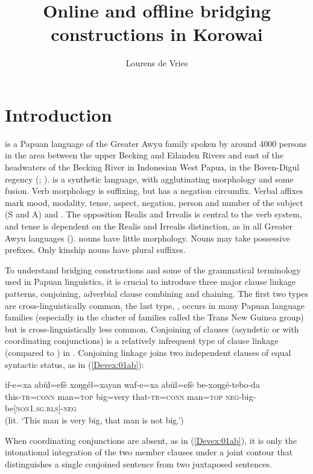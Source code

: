\documentclass[output=paper]{LSP/langsci}
\author{
   Lourens de Vries\affiliation{Vrije Universiteit Amsterdam} 
   }
\title{Online and offline bridging constructions in Korowai}
\begin{document}
\section{Introduction} 
\label{Devsec:Introduction}
 is a Papuan language of the Greater Awyu family spoken by around 4000 persons in the area between the upper Becking and Eilanden Rivers and east of the headwaters of the Becking River in Indonesian West Papua, in the Boven-Digul regency (\citealt{enk97}; \citealt{devries.2012}).  is a synthetic language, with agglutinating morphology and some fusion. Verb morphology is suffixing, but  has a negation circumfix. Verbal affixes mark mood, modality, tense, aspect, negation, person and number of the subject (S and A) and . The opposition Realis and Irrealis is central to the verb system, and tense is dependent on the Realis and Irrealis distinction, as in all Greater Awyu languages (\citealt{wester14}).  nouns have little morphology. Nouns may take possessive prefixes. Only kinship nouns have plural suffixes.

To understand  bridging constructions and some of the grammatical terminology used in Papuan linguistics, it is crucial to introduce three major  clause linkage patterns, conjoining, adverbial clause combining and chaining. The first two types are cross-linguistically common, the last type, , occurs in many Papuan language families (especially in the cluster of families called the Trans New Guinea group) but is cross-linguistically less common. Conjoining of clauses (asyndetic or with coordinating conjunctions) is a relatively infrequent type of clause linkage (compared to ) in . Conjoining linkage joins two independent clauses of equal syntactic status, as in (\ref{Devex:01ab}):

\begin{exe}
\ex \label{Devex:01ab}
\gll if-e=xa abül=efè xoŋgél=xayan waf-e=xa abül=efè be-xoŋgé-tebo-da\\
this-\textsc{tr=conn} man=\textsc{top}	big=very that-\textsc{tr=conn}	man=\textsc{top} \textsc{neg}-big-be[\textsc{non1.sg.rls}]-\textsc{neg}\\
\glt {}
(lit. `This man is very big, that man is not big.') \citep[][71]{enk97}\\
\end{exe}

When coordinating conjunctions are absent, as in (\ref{Devex:01ab}), it is only the intonational integration of the two member clauses under a joint contour that distinguishes a single conjoined sentence from two juxtaposed sentences. 
\end{document}
